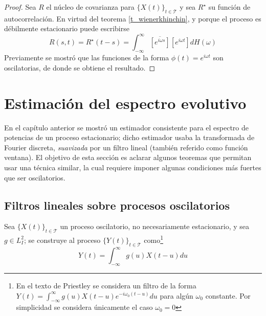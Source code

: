 \documentclass[12pt,letterpaper]{book}
\newcommand{\intR}{\int_{-\infty}^{\infty}}
\newcommand{\abso}[1]{\left| #1 \right|}
\newcommand{\xt}{$\{X(t)\}_{t\in \mathcal{T}}$ }
\newcommand{\lldos}{L^{2}_I}
\begin{document}
\begin{proof}
Sea $R$ el núcleo de covarianza para \xt y sea $R^\star$ su función de autocorrelación. 
En virtud del teorema \ref{t_wienerkhinchin}, y porque el proceso es débilmente estacionario
puede escribirse
\begin{equation}
R(s,t) = R^\star({t-s}) 
= \intR  \overline{\left[e^{i \omega {s}}\right]} \left[e^{i \omega {t}}\right]  dH(\omega)
\end{equation}
Previamente se mostró que las funciones de la forma $\phi(t) = e^{i \omega t}$ son oscilatorias, de donde se obtiene el resultado.
\end{proof}


\section{Estimación del espectro evolutivo}
\label{sec:estimacion}

En el capítulo anterior se mostró un estimador consistente para el espectro de potencias de un proceso estacionario; dicho estimador usaba la transformada de Fourier discreta, \textit{suavizada} por un filtro lineal (también referido como función ventana).
%
El objetivo de esta sección es aclarar algunos teoremas que permitan usar una técnica similar, la cual requiere imponer algunas condiciones más fuertes que ser oscilatorios.

\subsection{Filtros lineales sobre procesos oscilatorios}

Sea \xt un proceso oscilatorio, no necesariamente estacionario, y sea $g\in \lldos$; se construye al proceso $\{Y(t)\}_{t\in \mathcal{T}}$ como\footnote{En el texto de Priestley se considera un filtro de la forma $Y(t) = \intR g(u) X(t-u) e^{-i \omega_0 (t-u)} du$ para algún $\omega_0$ constante. 
%
Por simplicidad se considera únicamente el caso $\omega_0=0$}
\begin{equation}
Y(t) = \intR g(u) X(t-u) du
\end{equation}
\end{document}
